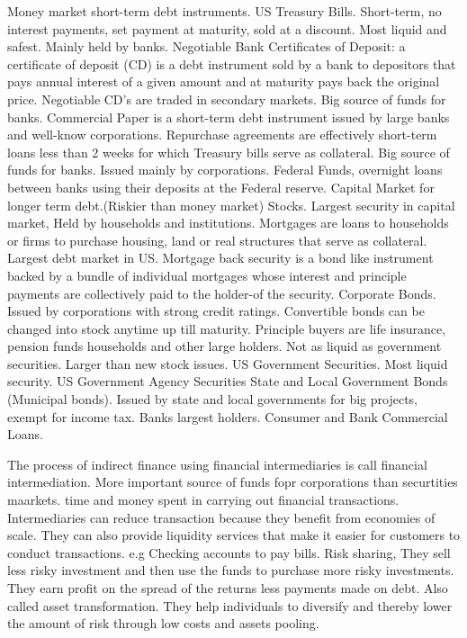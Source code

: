 \documentclass[12pt]{examnotes}
\begin{document}

\ra Money market short-term debt instruments.
 US Treasury Bills. Short-term, no interest payments, set payment at maturity, sold at a discount. Most liquid and safest. Mainly held by banks.
 Negotiable Bank Certificates of Deposit: a certificate of deposit (CD) is a debt instrument sold by a bank to depositors that pays annual interest of a given amount and at maturity pays back the original price. Negotiable CD’s are traded in secondary markets.  Big source of funds for banks.
 Commercial Paper is a short-term debt instrument issued by large banks and well-know corporations.
 Repurchase agreements are effectively short-term loans less than 2 weeks for which Treasury bills serve as collateral. Big source of funds for banks. Issued mainly by corporations.
 Federal Funds, overnight loans between banks using their deposits at the Federal reserve.
\vspace{6pt}
\ra Capital Market for longer term debt.(Riskier than money market) 
 Stocks. Largest security in capital market, Held by households and institutions.
 Mortgages are loans to households or firms to purchase housing, land or real structures that serve as collateral. Largest debt market in US. 
\rna  Mortgage back security is a bond like instrument backed by a bundle of individual mortgages whose interest and principle payments are collectively paid to the holder-of the security.
 Corporate Bonds. Issued by corporations with strong credit ratings. Convertible bonds can be changed into stock anytime up till maturity. Principle buyers are life insurance, pension funds households and other large holders. Not as liquid as government securities. Larger than new stock issues.
 US Government Securities. Most liquid security.
 US Government Agency Securities
 State and Local Government Bonds (Municipal bonds). Issued by state and local governments for big projects, exempt for income tax. Banks largest holders.
 Consumer and Bank Commercial Loans.

\ra The process of indirect finance using financial intermediaries is call financial intermediation.
\ra More important source of funds fopr corporations than securtities maarkets.
\raa time and money spent in carrying out financial transactions.  Intermediaries can reduce transaction because they benefit from economies of scale. They can also provide liquidity services that make it easier for customers to conduct transactions. e.g Checking accounts to pay bills.
Risk sharing, They sell less risky investment and then use the funds to purchase more risky investments. They earn profit on the spread of the returns less payments made on debt. Also called asset transformation. They help individuals to diversify and thereby lower the amount of risk through low costs and assets pooling.
\end{document}
